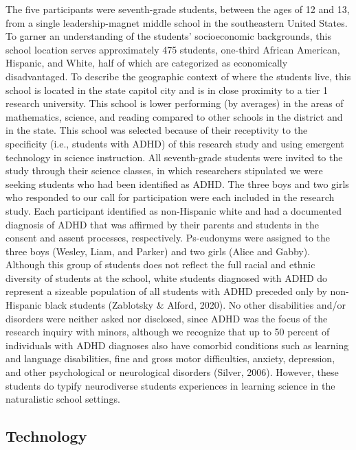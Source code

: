 \documentclass[11.5pt]{sig-alternate} %
\begin{document}
\begin{large}
The five participants were seventh-grade students, between the ages of 12 and 13, from a single leadership-magnet middle school in the southeastern United States. To garner an understanding of the students’ socioeconomic backgrounds, this school location serves approximately 475 students, one-third African American, Hispanic, and White, half of which are categorized as economically disadvantaged. To describe the geographic context of where the students live, this school is located in the state capitol city and is in close proximity to a tier 1 research university. This school is lower performing (by averages) in the areas of mathematics, science, and reading compared to other schools in the district and in the state. This school was selected because of their receptivity to the specificity (i.e., students with ADHD) of this research study and using emergent technology in science instruction. All seventh-grade students were invited to the study through their science classes, in which researchers stipulated we were seeking students who had been identified as ADHD. The three boys and two girls who responded to our call for participation were each included in the research study. Each participant identified as non-Hispanic white and had a documented diagnosis of ADHD that was affirmed by their parents and students in the consent and assent processes, respectively. Ps-eudonyms were assigned to the three boys (Wesley, Liam, and Parker) and two girls (Alice and Gabby). Although this group of students does not reflect the full racial and ethnic diversity of students at the school, white students diagnosed with ADHD do represent a sizeable population of all students with ADHD preceded only by non-Hispanic black students (Zablotsky \& Alford, 2020). No other disabilities and/or disorders were neither asked nor disclosed, since ADHD was the focus of the research inquiry with minors, although we recognize that up to 50 percent of individuals with ADHD diagnoses also have comorbid conditions such as learning and language disabilities, fine and gross motor difficulties, anxiety, depression, and other psychological or neurological disorders (Silver, 2006). However, these students do typify neurodiverse students experiences in learning science in the naturalistic school settings.

\subsection*{Technology}


\end{large}
\end{document}
